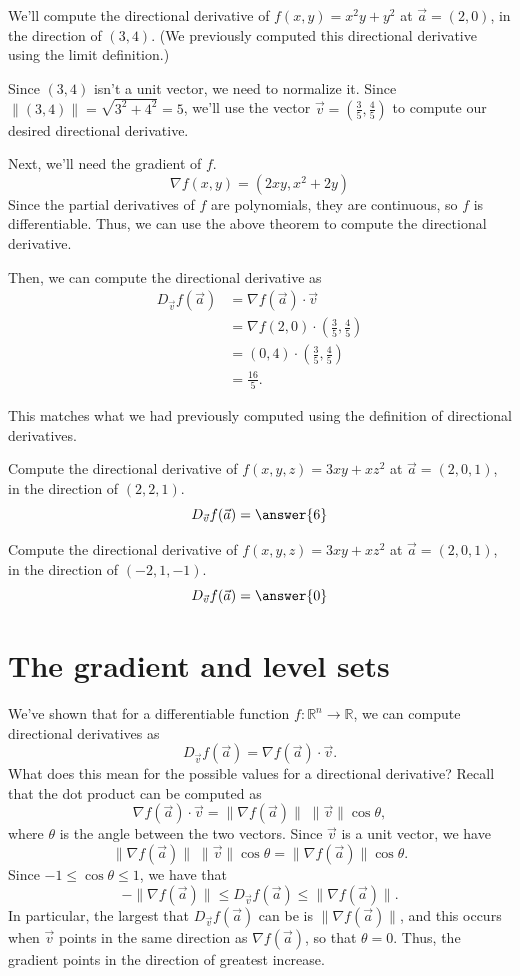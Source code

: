 \documentclass{ximera}
\begin{document}
\begin{example}
We'll compute the directional derivative of $f(x,y) = x^2y+y^2$ at $\vec{a}=(2,0)$, in the direction of $(3,4)$. (We previously computed this directional derivative using the limit definition.)

Since $(3,4)$ isn't a unit vector, we need to normalize it. Since $\|(3,4)\| = \sqrt{3^2+4^2}=5$, we'll use the vector $\vec{v}=\left(\frac{3}{5},\frac{4}{5}\right)$ to compute our desired directional derivative.

Next, we'll need the gradient of $f$.
\[
\nabla f(x,y) = (2xy, x^2+2y)
\]
Since the partial derivatives of $f$ are polynomials, they are continuous, so $f$ is differentiable. Thus, we can use the above theorem to compute the directional derivative.

Then, we can compute the directional derivative as
\begin{align*}
D_{\vec{v}}f(\vec{a}) &= \nabla f(\vec{a})\cdot \vec{v}\\
&= \nabla f(2,0)\cdot \left(\frac{3}{5},\frac{4}{5}\right)\\
&= (0,4)\cdot \left(\frac{3}{5},\frac{4}{5}\right)\\
&= \frac{16}{5}.
\end{align*}

This matches what we had previously computed using the definition of directional derivatives.
\end{example}

\begin{problem}
Compute the directional derivative of $f(x,y,z) = 3xy+xz^2$ at $\vec{a}=(2,0,1)$, in the direction of $(2, 2, 1)$.
\[
D_{\vec{v}}f(\vec{a}) = \answer{6}
\]

Compute the directional derivative of $f(x,y,z) = 3xy+xz^2$ at $\vec{a}=(2,0,1)$, in the direction of $(-2,1,-1)$.
\[
D_{\vec{v}}f(\vec{a}) = \answer{0}
\]
\end{problem}

\section*{The gradient and level sets}

We've shown that for a differentiable function $f:\mathbb{R}^n\rightarrow\mathbb{R}$, we can compute directional derivatives as
\[
D_{\vec{v}}f(\vec{a}) = \nabla f(\vec{a})\cdot \vec{v}.
\]
What does this mean for the possible values for a directional derivative? Recall that the dot product can be computed as
\[
\nabla f(\vec{a})\cdot \vec{v} = \|\nabla f(\vec{a})\|\;\|\vec{v}\|\cos\theta,
\]
where $\theta$ is the angle between the two vectors. Since $\vec{v}$ is a unit vector, we have
\[
\|\nabla f(\vec{a})\|\;\|\vec{v}\|\cos\theta = \|\nabla f(\vec{a})\|\cos\theta.
\]
Since $-1\leq \cos\theta \leq 1$, we have that
\[
-\|\nabla f(\vec{a})\|\leq D_{\vec{v}}f(\vec{a})\leq \|\nabla f(\vec{a})\|.
\]
In particular, the largest that $D_{\vec{v}}f(\vec{a})$ can be is $\|\nabla f(\vec{a})\|$, and this occurs when $\vec{v}$ points in the same direction as $\nabla f(\vec{a})$, so that $\theta = 0$. Thus, the gradient points in the direction of greatest increase.
\end{document}
